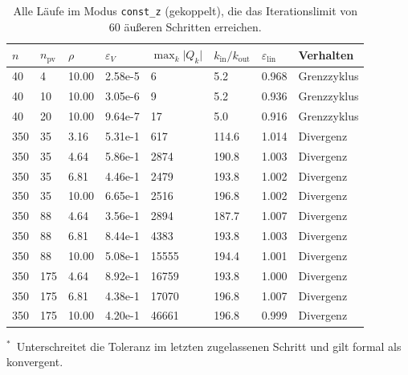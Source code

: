 \begin{table}[htbp]
\centering
\caption{Alle L\"aufe im Modus \texttt{const\_z} (gekoppelt), die das Iterationslimit von $60$ \"au\ss eren Schritten erreichen.}
\label{tab:rx-outer-fail}
\begin{tabular}{llllllll}
\toprule
$n$ & $n_\mathrm{pv}$ & $\rho$ & $\varepsilon_V$ & $\max_k\lvert Q_k\rvert$ & $k_{\mathrm{in}}/k_{\mathrm{out}}$ & $\varepsilon_{\mathrm{lin}}$ & Verhalten \\
\midrule
40 & 4 & 10.00 & 2.58e-5 & 6 & 5.2 & 0.968 & Grenzzyklus \\
40 & 10 & 10.00 & 3.05e-6 & 9 & 5.2 & 0.936 & Grenzzyklus \\
40 & 20 & 10.00 & 9.64e-7 & 17 & 5.0 & 0.916 & Grenzzyklus\rlap{$^{\ast}$} \\
350 & 35 & 3.16 & 5.31e-1 & 617 & 114.6 & 1.014 & Divergenz \\
350 & 35 & 4.64 & 5.86e-1 & 2874 & 190.8 & 1.003 & Divergenz \\
350 & 35 & 6.81 & 4.46e-1 & 2479 & 193.8 & 1.002 & Divergenz \\
350 & 35 & 10.00 & 6.65e-1 & 2516 & 196.8 & 1.002 & Divergenz \\
350 & 88 & 4.64 & 3.56e-1 & 2894 & 187.7 & 1.007 & Divergenz \\
350 & 88 & 6.81 & 8.44e-1 & 4383 & 193.8 & 1.003 & Divergenz \\
350 & 88 & 10.00 & 5.08e-1 & 15555 & 194.4 & 1.001 & Divergenz \\
350 & 175 & 4.64 & 8.92e-1 & 16759 & 193.8 & 1.000 & Divergenz \\
350 & 175 & 6.81 & 4.38e-1 & 17070 & 196.8 & 1.007 & Divergenz \\
350 & 175 & 10.00 & 4.20e-1 & 46661 & 196.8 & 0.999 & Divergenz \\
\bottomrule
\end{tabular}

\smallskip
\footnotesize
\raggedright
$^{\ast}$~Unterschreitet die Toleranz im letzten zugelassenen Schritt und gilt formal als konvergent.
\end{table}
